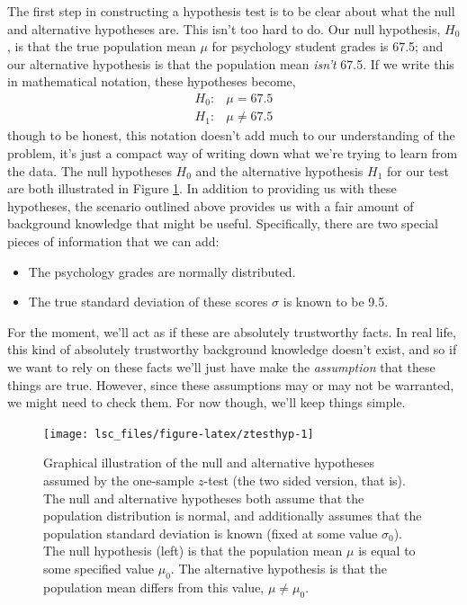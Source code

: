 \documentclass[
]{book}
\providecommand{\tightlist}{%
  \setlength{\itemsep}{0pt}\setlength{\parskip}{0pt}}
\theoremstyle{definition}
\theoremstyle{definition}
\theoremstyle{definition}
\theoremstyle{definition}
\theoremstyle{remark}
\begin{document}
The first step in constructing a hypothesis test is to be clear about what the null and alternative hypotheses are. This isn't too hard to do. Our null hypothesis, \(H_0\), is that the true population mean \(\mu\) for psychology student grades is 67.5; and our alternative hypothesis is that the population mean \emph{isn't} 67.5. If we write this in mathematical notation, these hypotheses become,
\[
\begin{array}{ll}
H_0: & \mu = 67.5 \\
H_1: & \mu \neq 67.5
\end{array}
\]
though to be honest, this notation doesn't add much to our understanding of the problem, it's just a compact way of writing down what we're trying to learn from the data. The null hypotheses \(H_0\) and the alternative hypothesis \(H_1\) for our test are both illustrated in Figure \ref{fig:ztesthyp}. In addition to providing us with these hypotheses, the scenario outlined above provides us with a fair amount of background knowledge that might be useful. Specifically, there are two special pieces of information that we can add:

\begin{itemize}
\tightlist
\item
  The psychology grades are normally distributed.
\item
  The true standard deviation of these scores \(\sigma\) is known to be 9.5.
\end{itemize}

For the moment, we'll act as if these are absolutely trustworthy facts. In real life, this kind of absolutely trustworthy background knowledge doesn't exist, and so if we want to rely on these facts we'll just have make the \emph{assumption} that these things are true. However, since these assumptions may or may not be warranted, we might need to check them. For now though, we'll keep things simple.

\begin{figure}

{\centering \texttt{[image: lsc\_files/figure-latex/ztesthyp-1]} 

}

\caption{Graphical illustration of the null and alternative hypotheses assumed by the one-sample $z$-test (the two sided version, that is). The null and alternative hypotheses both assume that the population distribution is normal, and additionally assumes that the population standard deviation is known (fixed at some value $\sigma_0$). The null hypothesis (left) is that the population mean $\mu$ is equal to some specified value $\mu_0$. The alternative hypothesis is that the population mean differs from this value, $\mu \neq \mu_0$.}\label{fig:ztesthyp}
\end{figure}
\end{document}
